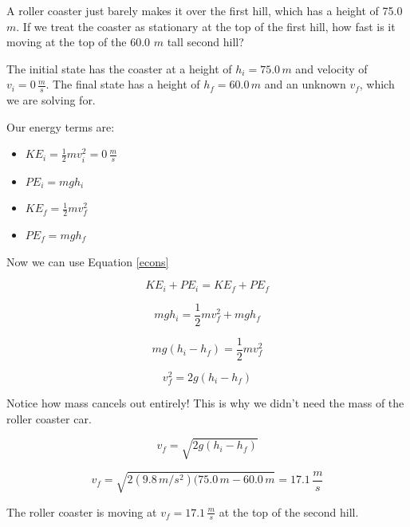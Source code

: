 \documentclass[12pt]{book}
\begin{document}
\begin{exampleblock}

A roller coaster just barely makes it over the first hill, which has a height of 75.0 $m$. If we treat the coaster as stationary at the top of the first hill, how fast is it moving at the top of the 60.0 $m$ tall second hill?

\hspace{10pt}

The initial state has the coaster at a height of $h_i = 75.0 \, m$ and velocity of $v_i = 0 \, \frac{m}{s}$. The final state has a height of $h_f = 60.0 \, m$ and an unknown $v_f$, which we are solving for.

Our energy terms are:

\begin{itemize}
\item $KE_i = \frac{1}{2} m v_i^2 = 0 \, \frac{m}{s}$
\item $PE_i = mgh_i$
\item $KE_f = \frac{1}{2} m v_f^2$
\item $PE_f = mgh_f$
\end{itemize}

Now we can use Equation \ref{econs}

\begin{equation}
KE_i + PE_i = KE_f + PE_f
\end{equation}

\begin{equation}
mgh_i = \frac{1}{2} m v_f^2 + mgh_f
\end{equation}

\begin{equation}
mg(h_i - h_f) = \frac{1}{2} m v_f^2
\end{equation}

\begin{equation}
v_f^2 = 2g(h_i - h_f)
\end{equation}

Notice how mass cancels out entirely! This is why we didn't need the mass of the roller coaster car.

\begin{equation}
v_f = \sqrt{2g(h_i - h_f)}
\end{equation}

\begin{equation}
v_f = \sqrt{2(9.8 \, m/s^2) (75.0 \, m - 60.0 \, m} = 17.1 \, \frac{m}{s}
\end{equation}

The roller coaster is moving at $v_f = 17.1 \, \frac{m}{s}$ at the top of the second hill.

\end{exampleblock}
\end{document}
